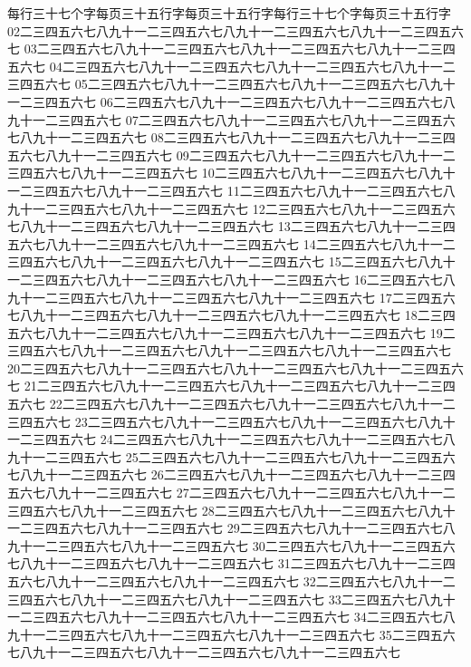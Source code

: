 \documentclass{standalone}
\begin{document}
每行三十七个字每页三十五行字每页三十五行字每行三十七个字每页三十五行字
02二三四五六七八九十一二三四五六七八九十一二三四五六七八九十一二三四五六七
03二三四五六七八九十一二三四五六七八九十一二三四五六七八九十一二三四五六七
04二三四五六七八九十一二三四五六七八九十一二三四五六七八九十一二三四五六七
05二三四五六七八九十一二三四五六七八九十一二三四五六七八九十一二三四五六七
06二三四五六七八九十一二三四五六七八九十一二三四五六七八九十一二三四五六七
07二三四五六七八九十一二三四五六七八九十一二三四五六七八九十一二三四五六七
08二三四五六七八九十一二三四五六七八九十一二三四五六七八九十一二三四五六七
09二三四五六七八九十一二三四五六七八九十一二三四五六七八九十一二三四五六七
10二三四五六七八九十一二三四五六七八九十一二三四五六七八九十一二三四五六七
11二三四五六七八九十一二三四五六七八九十一二三四五六七八九十一二三四五六七
12二三四五六七八九十一二三四五六七八九十一二三四五六七八九十一二三四五六七
13二三四五六七八九十一二三四五六七八九十一二三四五六七八九十一二三四五六七
14二三四五六七八九十一二三四五六七八九十一二三四五六七八九十一二三四五六七
15二三四五六七八九十一二三四五六七八九十一二三四五六七八九十一二三四五六七
16二三四五六七八九十一二三四五六七八九十一二三四五六七八九十一二三四五六七
17二三四五六七八九十一二三四五六七八九十一二三四五六七八九十一二三四五六七
18二三四五六七八九十一二三四五六七八九十一二三四五六七八九十一二三四五六七
19二三四五六七八九十一二三四五六七八九十一二三四五六七八九十一二三四五六七
20二三四五六七八九十一二三四五六七八九十一二三四五六七八九十一二三四五六七
21二三四五六七八九十一二三四五六七八九十一二三四五六七八九十一二三四五六七
22二三四五六七八九十一二三四五六七八九十一二三四五六七八九十一二三四五六七
23二三四五六七八九十一二三四五六七八九十一二三四五六七八九十一二三四五六七
24二三四五六七八九十一二三四五六七八九十一二三四五六七八九十一二三四五六七
25二三四五六七八九十一二三四五六七八九十一二三四五六七八九十一二三四五六七
26二三四五六七八九十一二三四五六七八九十一二三四五六七八九十一二三四五六七
27二三四五六七八九十一二三四五六七八九十一二三四五六七八九十一二三四五六七
28二三四五六七八九十一二三四五六七八九十一二三四五六七八九十一二三四五六七
29二三四五六七八九十一二三四五六七八九十一二三四五六七八九十一二三四五六七
30二三四五六七八九十一二三四五六七八九十一二三四五六七八九十一二三四五六七
31二三四五六七八九十一二三四五六七八九十一二三四五六七八九十一二三四五六七
32二三四五六七八九十一二三四五六七八九十一二三四五六七八九十一二三四五六七
33二三四五六七八九十一二三四五六七八九十一二三四五六七八九十一二三四五六七
34二三四五六七八九十一二三四五六七八九十一二三四五六七八九十一二三四五六七
35二三四五六七八九十一二三四五六七八九十一二三四五六七八九十一二三四五六七
\end{document}
